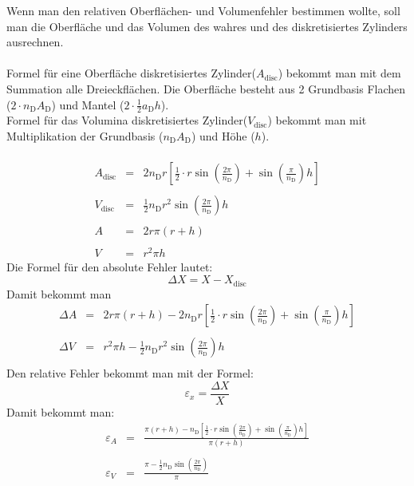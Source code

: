 \documentclass[Protokollheft.tex]{subfiles}
\begin{document}
	Wenn man den relativen Oberflächen- und Volumenfehler bestimmen wollte, soll man die Oberfläche und das Volumen des wahres und des diskretisiertes Zylinders ausrechnen.
	\\
	\\
	Formel für eine Oberfläche diskretisiertes Zylinder($A_\text{disc}$) bekommt man mit dem Summation alle Dreieckflächen. Die Oberfläche besteht aus 2 Grundbasis Flachen ($2\cdot n_\text{D}A_\text{D}$) und Mantel ($2\cdot\frac12  a_\text{D}h$).\\
		Formel für das Volumina diskretisiertes Zylinder($V_\text{disc}$) bekommt man mit Multiplikation der Grundbasis ($ n_\text{D}A_\text{D}$) und Höhe ($h$).\\
	\\  
	\begin{eqnarray*}
		A_\text{disc}&=&2n_\text{D}r\left[ \frac12 \cdot r \sin\left(\frac{2 \pi}{n_\text{D}}\right)+ \sin\left(\frac{\pi}{n_\text{D}}\right)h  \right]\\
	    \\
		V_\text{disc}&=&\frac12 n_\text{D} r^2 \sin\left(\frac{ 2\pi}{n_\text{D}}\right)h\\
		\\
		A&=&2 r \pi (r+h)\\
		\\
		V&=&r^2\pi h
	\end{eqnarray*}
	Die Formel für den absolute Fehler lautet:\\
	$$\Delta X = X- X_\text{disc}$$
	Damit bekommt man
	\begin{eqnarray*}
		\Delta A&=&2 r \pi (r+h) -2n_\text{D}r\left[ \frac12 \cdot r \sin\left(\frac{2 \pi}{n_\text{D}}\right)+ \sin\left(\frac{\pi}{n_\text{D}}\right)h  \right]\\
		\\
		\Delta V&=&r^2\pi h -\frac12 n_\text{D} r^2 \sin\left(\frac{ 2\pi}{n_\text{D}}\right)h\\
	\end{eqnarray*}
	Den relative Fehler bekommt man mit der Formel:
	$$\varepsilon_{x}=\frac{\Delta X}{X}$$
	Damit bekommt man:
	\begin{eqnarray*}
		\varepsilon_{A}&=&\frac{ \pi (r+h) -n_\text{D}\left[ \frac12 \cdot r \sin\left(\frac{2 \pi}{n_\text{D}}\right)+ \sin\left(\frac{\pi}{n_\text{D}}\right)h  \right]}{\pi (r+h)}\\
		\\
		\varepsilon_{V}&=&\frac{\pi  -\frac12 n_\text{D}  \sin\left(\frac{ 2\pi}{n_\text{D}}\right)}{\pi}
	\end{eqnarray*}
\end{document}
